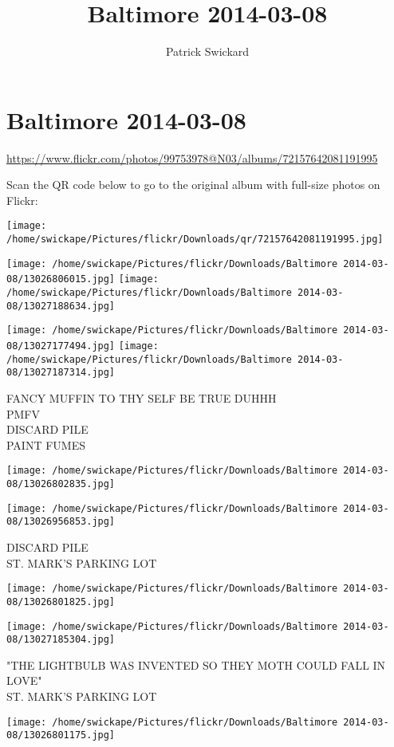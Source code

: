 \documentclass[10pt,letterpaper]{article}
\title{Baltimore 2014-03-08}
\author{Patrick Swickard}
\date{}
\begin{document}
\section*{Baltimore 2014-03-08}

\url{https://www.flickr.com/photos/99753978@N03/albums/72157642081191995}

Scan the QR code below to go to the original album with full-size photos on Flickr:

\texttt{[image: /home/swickape/Pictures/flickr/Downloads/qr/72157642081191995.jpg]}
\pagebreak

\texttt{[image: /home/swickape/Pictures/flickr/Downloads/Baltimore 2014-03-08/13026806015.jpg]}
\texttt{[image: /home/swickape/Pictures/flickr/Downloads/Baltimore 2014-03-08/13027188634.jpg]}

\texttt{[image: /home/swickape/Pictures/flickr/Downloads/Baltimore 2014-03-08/13027177494.jpg]}
\texttt{[image: /home/swickape/Pictures/flickr/Downloads/Baltimore 2014-03-08/13027187314.jpg]}

FANCY MUFFIN TO THY SELF BE TRUE DUHHH\\
PMFV\\
DISCARD PILE\\
PAINT FUMES
\pagebreak

\texttt{[image: /home/swickape/Pictures/flickr/Downloads/Baltimore 2014-03-08/13026802835.jpg]}

\vspace{0.25in}
\texttt{[image: /home/swickape/Pictures/flickr/Downloads/Baltimore 2014-03-08/13026956853.jpg]}

DISCARD PILE\\
ST. MARK'S PARKING LOT
\pagebreak

\texttt{[image: /home/swickape/Pictures/flickr/Downloads/Baltimore 2014-03-08/13026801825.jpg]}

\vspace{0.25in}
\texttt{[image: /home/swickape/Pictures/flickr/Downloads/Baltimore 2014-03-08/13027185304.jpg]}

"THE LIGHTBULB WAS INVENTED SO THEY MOTH COULD FALL IN LOVE"\\
ST. MARK'S PARKING LOT
\pagebreak

\texttt{[image: /home/swickape/Pictures/flickr/Downloads/Baltimore 2014-03-08/13026801175.jpg]}
\end{document}
